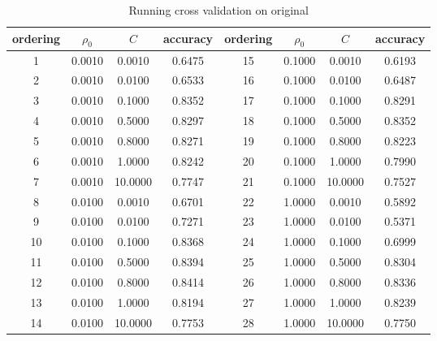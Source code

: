 \documentclass[12pt, fullpage,letterpaper]{article}
\begin{document}
\begin{enumerate}
 
\begin{table}[h] 
    \centering
    \begin{tabular}{|c|c|c|c|c|c|c|c|}
    \hline
  ordering  &$\rho_0$& $C$ & accuracy & ordering &  $\rho_0$& $C$ & accuracy \\
    \hline
1 & 0.0010 & 0.0010 & 0.6475 & 15 & 0.1000 & 0.0010 & 0.6193\\
2 & 0.0010 & 0.0100 & 0.6533 & 16 & 0.1000 & 0.0100 & 0.6487\\
3 & 0.0010 & 0.1000 & 0.8352 & 17 & 0.1000 & 0.1000 & 0.8291\\
4 & 0.0010 & 0.5000 & 0.8297 & 18 & 0.1000 & 0.5000 & 0.8352\\
5 & 0.0010 & 0.8000 & 0.8271 & 19 & 0.1000 & 0.8000 & 0.8223\\
6 & 0.0010 & 1.0000 & 0.8242 & 20 & 0.1000 & 1.0000 & 0.7990\\
7 & 0.0010 & 10.0000 & 0.7747 & 21 & 0.1000 & 10.0000 & 0.7527\\
8 & 0.0100 & 0.0010 & 0.6701 & 22 & 1.0000 & 0.0010 & 0.5892\\
9 & 0.0100 & 0.0100 & 0.7271 & 23 & 1.0000 & 0.0100 & 0.5371\\
10 & 0.0100 & 0.1000 & 0.8368 & 24 & 1.0000 & 0.1000 & 0.6999\\
11 & 0.0100 & 0.5000 & 0.8394 & 25 & 1.0000 & 0.5000 & 0.8304\\
12 & 0.0100 & 0.8000 & 0.8414 & 26 & 1.0000 & 0.8000 & 0.8336\\
13 & 0.0100 & 1.0000 & 0.8194 & 27 & 1.0000 & 1.0000 & 0.8239\\
14 & 0.0100 & 10.0000 & 0.7753 & 28 & 1.0000 & 10.0000 & 0.7750\\
      \hline
    \end{tabular}
    \caption{Running cross validation on original  }\label{t:4}
  \end{table}


\end{enumerate}
\end{document}
